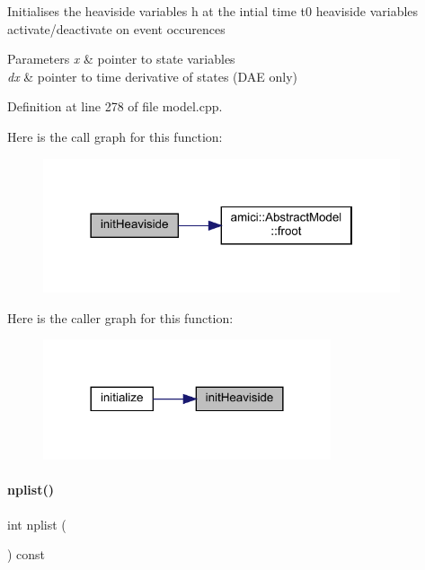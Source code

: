 Initialises the heaviside variables h at the intial time t0 heaviside variables activate/deactivate on event occurences 
\begin{DoxyParams}{Parameters}
{\em x} & pointer to state variables \\
\hline
{\em dx} & pointer to time derivative of states (D\+AE only) \\
\hline
\end{DoxyParams}


Definition at line 278 of file model.\+cpp.

Here is the call graph for this function\+:
\nopagebreak
\begin{figure}[H]
\begin{center}
\leavevmode
\includegraphics[width=298pt]{classamici_1_1_model_afc1c1ffc33f397ed131f85c8321dd677_cgraph}
\end{center}
\end{figure}
Here is the caller graph for this function\+:
\nopagebreak
\begin{figure}[H]
\begin{center}
\leavevmode
\includegraphics[width=240pt]{classamici_1_1_model_afc1c1ffc33f397ed131f85c8321dd677_icgraph}
\end{center}
\end{figure}
\mbox{\label{classamici_1_1_model_a0f8e994055e37954d7746f3c1af27a5c}} 
\paragraph{\texorpdfstring{nplist()}{nplist()}}
{\footnotesize\ttfamily int nplist (\begin{DoxyParamCaption}{ }\end{DoxyParamCaption}) const}

